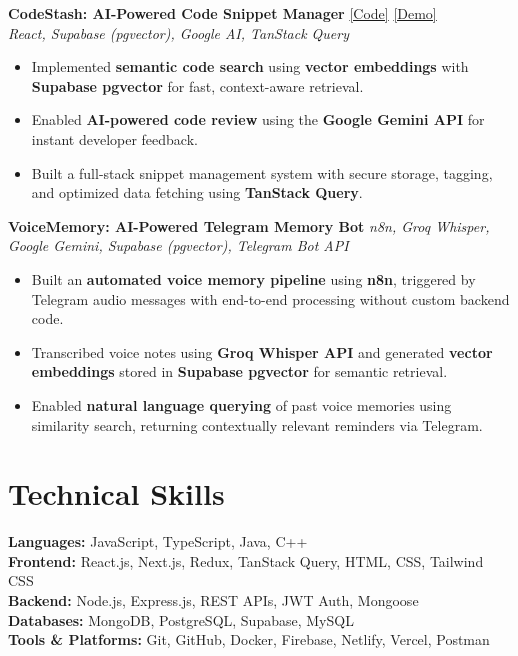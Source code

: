 \documentclass[10pt, a4paper]{article}
\begin{document}
\textbf{CodeStash: AI-Powered Code Snippet Manager} \hfill \href{https://github.com/kryonic-fluke/code_snippet_manager}{[Code]} \href{https://codestashin.netlify.app}{[Demo]} \\
\textit{React, Supabase (pgvector), Google AI, TanStack Query}
\begin{itemize}[leftmargin=*, itemsep=2pt, topsep=2pt]
\item Implemented \textbf{semantic code search} using \textbf{vector embeddings} with \textbf{Supabase pgvector} for fast, context-aware retrieval.
\item Enabled \textbf{AI-powered code review} using the \textbf{Google Gemini API} for instant developer feedback.
\item Built a full-stack snippet management system with secure storage, tagging, and optimized data fetching using \textbf{TanStack Query}.
\end{itemize}

\textbf{VoiceMemory: AI-Powered Telegram Memory Bot} \hfill 
\textit{n8n, Groq Whisper, Google Gemini, Supabase (pgvector), Telegram Bot API}
\begin{itemize}[leftmargin=*, itemsep=2pt, topsep=2pt]
\item Built an \textbf{automated voice memory pipeline} using \textbf{n8n}, triggered by Telegram audio messages with end-to-end processing without custom backend code.
\item Transcribed voice notes using \textbf{Groq Whisper API} and generated \textbf{vector embeddings} stored in \textbf{Supabase pgvector} for semantic retrieval.
\item Enabled \textbf{natural language querying} of past voice memories using similarity search, returning contextually relevant reminders via Telegram.
\end{itemize}

\section*{Technical Skills}
\textbf{Languages:} JavaScript, TypeScript, Java, C++ \\
\textbf{Frontend:} React.js, Next.js, Redux, TanStack Query, HTML, CSS, Tailwind CSS \\
\textbf{Backend:} Node.js, Express.js, REST APIs, JWT Auth, Mongoose \\
\textbf{Databases:} MongoDB, PostgreSQL, Supabase, MySQL \\
\textbf{Tools \& Platforms:} Git, GitHub, Docker, Firebase, Netlify, Vercel, Postman
\end{document}
